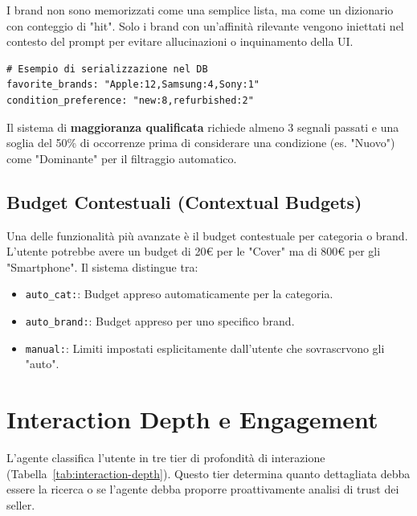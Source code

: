 I brand non sono memorizzati come una semplice lista, ma come un dizionario con conteggio di "hit". Solo i brand con un'affinità rilevante vengono iniettati nel contesto del prompt per evitare allucinazioni o inquinamento della UI.

\begin{verbatim}
# Esempio di serializzazione nel DB
favorite_brands: "Apple:12,Samsung:4,Sony:1"
condition_preference: "new:8,refurbished:2"
\end{verbatim}

Il sistema di \textbf{maggioranza qualificata} richiede almeno 3 segnali passati e una soglia del 50\% di occorrenze prima di considerare una condizione (es. "Nuovo") come "Dominante" per il filtraggio automatico.

\subsection{Budget Contestuali (Contextual Budgets)}
\label{subsec:profiling-context-budget}

Una delle funzionalità più avanzate è il budget contestuale per categoria o brand. L'utente potrebbe avere un budget di 20€ per le "Cover" ma di 800€ per gli "Smartphone". Il sistema distingue tra:
\begin{itemize}
    \item \texttt{auto\_cat:}: Budget appreso automaticamente per la categoria.
    \item \texttt{auto\_brand:}: Budget appreso per uno specifico brand.
    \item \texttt{manual:}: Limiti impostati esplicitamente dall'utente che sovrascrvono gli "auto".
\end{itemize}

\section{Interaction Depth e Engagement}
\label{sec:profiling-depth}

L'agente classifica l'utente in tre tier di profondità di interazione (Tabella~\ref{tab:interaction-depth}). Questo tier determina quanto dettagliata debba essere la ricerca o se l'agente debba proporre proattivamente analisi di trust dei seller.

